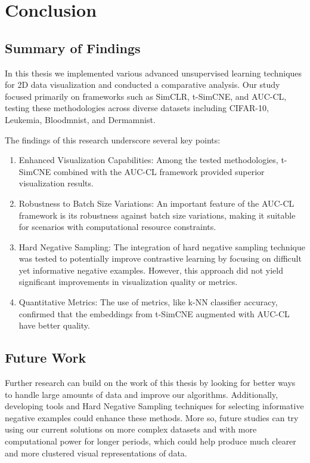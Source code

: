 \chapter{Conclusion}
\label{chap:conclusion}
\section{Summary of Findings}

In  this thesis we implemented various advanced unsupervised learning techniques for 2D data visualization and conducted a comparative analysis. Our study focused primarily on frameworks such as SimCLR, t-SimCNE, and AUC-CL, testing these methodologies across diverse datasets including CIFAR-10, Leukemia, Bloodmnist, and Dermamnist.

The findings of this research underscore several key points:
\begin{enumerate}
    \item {Enhanced Visualization Capabilities:} Among the tested methodologies, t-SimCNE combined with the AUC-CL framework provided superior visualization results. 
    \item {Robustness to Batch Size Variations:} An important feature of the AUC-CL framework is its robustness against batch size variations, making it suitable for scenarios with computational resource constraints.
    \item {Hard Negative Sampling:} The integration of hard negative sampling technique was tested to potentially improve contrastive learning by focusing on difficult yet informative negative examples. However, this approach did not yield significant improvements in visualization quality or metrics.
    \item {Quantitative Metrics:}  The use of metrics, like k-NN classifier accuracy, confirmed that the embeddings from t-SimCNE augmented with AUC-CL have better quality.
    
\end{enumerate}

\section{Future Work}

Further research can build on the work of this thesis by looking for better ways to handle large amounts of data and improve our algorithms. Additionally, developing tools and Hard Negative Sampling techniques for selecting informative negative examples could enhance these methods. More so, future studies can try using our current solutions on more complex datasets and with more computational power for longer periods, which could help produce much clearer and more clustered visual representations of data. 

